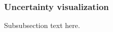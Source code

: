 \documentclass[journal]{IEEEtran}
\begin{document}
\subsubsection{Uncertainty visualization}
Subsubsection text here.


%
%



%
%
\end{document}
